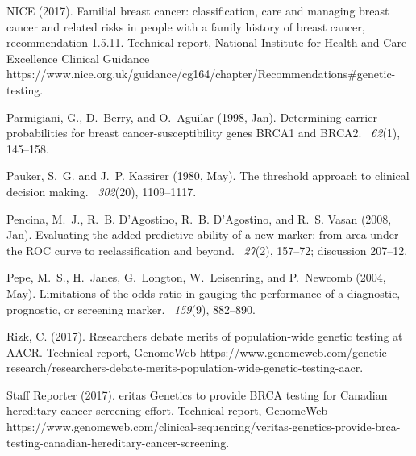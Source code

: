 \documentclass[11pt, letterpaper]{article}
\begin{document}
\begin{thebibliography}{}
	NICE (2017).
	\newblock Familial breast cancer: classification, care and managing breast
	cancer and related risks in people with a family history of breast cancer,
	recommendation 1.5.11.
	\newblock Technical report, {National Institute for Health and Care Excellence}
	Clinical Guidance
	{https://www.nice.org.uk/guidance/cg164/chapter/Recommendations\#genetic-testing}.
	
	Parmigiani, G., D.~Berry, and O.~Aguilar (1998, Jan).
	\newblock Determining carrier probabilities for breast cancer-susceptibility
	genes {BRCA}1 and {BRCA}2.
	~{\em 62\/}(1), 145--158.
	
	Pauker, S.~G. and J.~P. Kassirer (1980, May).
	\newblock The threshold approach to clinical decision making.
	~{\em 302\/}(20), 1109--1117.
	
	Pencina, M.~J., R.~B. D'Agostino, R.~B. D'Agostino, and R.~S. Vasan (2008,
	Jan).
	\newblock Evaluating the added predictive ability of a new marker: from area
	under the {ROC} curve to reclassification and beyond.
	~{\em 27\/}(2), 157--72; discussion 207--12.
	
	Pepe, M.~S., H.~Janes, G.~Longton, W.~Leisenring, and P.~Newcomb (2004, May).
	\newblock Limitations of the odds ratio in gauging the performance of a
	diagnostic, prognostic, or screening marker.
	~{\em 159\/}(9), 882--890.
	
	Rizk, C. (2017).
	\newblock Researchers debate merits of population-wide genetic testing at
	{AACR}.
	\newblock Technical report, {GenomeWeb}
	{https://www.genomeweb.com/genetic-research/researchers-debate-merits-population-wide-genetic-testing-aacr}.
	
	{Staff Reporter} (2017).
	eritas {G}enetics to provide {BRCA} testing for {C}anadian
	hereditary cancer screening effort.
	\newblock Technical report, {GenomeWeb}
	{https://www.genomeweb.com/clinical-sequencing/veritas-genetics-provide-brca-testing-canadian-hereditary-cancer-screening}.
	

\end{thebibliography}
\end{document}
